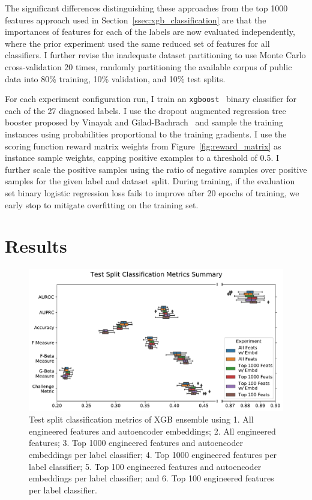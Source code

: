 \documentclass[\main/thesis.tex]{subfiles}
\begin{document}
The significant differences distinguishing these approaches from the top 1000 features approach used in Section~\ref{ssec:xgb_classification} are that the importances of features for each of the labels are now evaluated independently, where the prior experiment used the same reduced set of features for all classifiers.
I further revise the inadequate dataset partitioning to use Monte Carlo cross-validation 20 times, randomly partitioning the available corpus of public data into 80\% training, 10\% validation, and 10\% test splits.

For each experiment configuration run, I train an \texttt{xgboost}~\cite{chen_xgboost_2016} binary classifier for each of the 27 diagnosed labels.
I use the dropout augmented regression tree booster proposed by Vinayak and Gilad-Bachrach~\cite{vinayak_dart_2015} and sample the training instances using probabilities proportional to the training gradients.
I use the scoring function reward matrix weights from Figure~\ref{fig:reward_matrix} as instance sample weights, capping positive examples to a threshold of 0.5.
I further scale the positive samples using the ratio of negative samples over positive samples for the given label and dataset split.
During training, if the evaluation set binary logistic regression loss fails to improve after 20 epochs of training, we early stop to mitigate overfitting on the training set.

\section{Results}

\begin{figure}[h]
    \centering
    \includegraphics[trim={0.2cm 0.3cm 0.2cm 0.1cm},clip,width=\textwidth]{figure/xgb_aenc_classification_metrics.pdf}
    \caption[Test split classification metrics of XGB ensemble using all engineered features and autoencoder embeddings]{Test split classification metrics of XGB ensemble using 1. All engineered features and autoencoder embeddings; 2. All engineered features; 3. Top 1000 engineered features and autoencoder embeddings per label classifier; 4. Top 1000 engineered features per label classifier; 5. Top 100 engineered features and autoencoder embeddings per label classifier; and 6. Top 100 engineered features per label classifier.}
    \label{fig:xgb_aenc_classification_metrics}
\end{figure}
\end{document}
